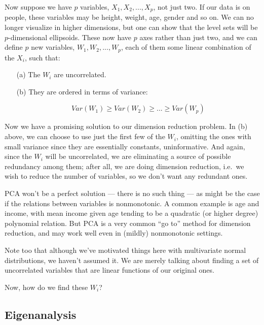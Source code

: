 Now suppose we have $p$ variables, $X_1,
X_2,...,X_p$, not just two.  If our data is on people, these variables
may be height, weight, age, gender and so on.  We can no longer
visualize in higher dimensions, but one can show that the level sets
will be $p$-dimensional ellipsoids.  These now have $p$ axes rather than
just two, and we can define $p$ new variables, $W_1,W_2,...,W_p$,
each of them some linear combination of 
the $X_i$, such that:

\begin{itemize}

\item [(a)] The $W_i$ are uncorrelated.

\item [(b)] They are ordered in terms of variance:

\begin{equation}
Var(W_1) \geq Var(W_2) \geq ... \geq Var(W_p)
\end{equation}

\end{itemize} 

Now we have a promising solution to our dimension reduction problem.  In
(b) above, we can choose to use just the first few of the $W_i$,
omitting the ones with small variance since they are essentially
constants, uninformative.  And again, since the $W_i$ will be
uncorrelated, we are eliminating a source of possible redundancy among
them; after all, we are doing dimension reduction, i.e.\ we wish to
reduce the number of variables, so we don't want any redundant ones.

PCA won't be a perfect solution --- there is no such thing --- as might
be the case if the relations between variables is nonmonotonic.  A
common example is age and income, with mean income given age tending to be a
quadratic (or higher degree) polynomial relation.  But PCA is a very
common ``go to'' method for dimension reduction, and may work well even
in (mildly) nonmonotonic settings.

Note too that although we've motivated things here with multivariate
normal distributions, we haven't assumed it.  We are merely talking
about finding a set of uncorrelated variables that are linear functions
of our original ones.

Now, how do we find these $W_i$?

\subsection{Eigenanalysis}

